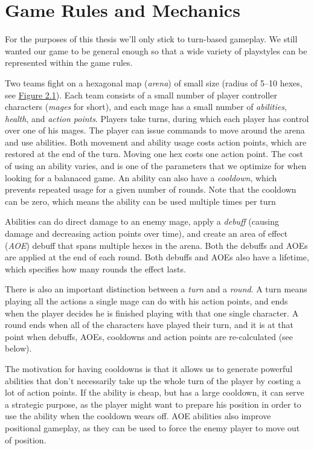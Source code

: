 \chapter{Game Rules and Mechanics}
\label{chapter02}

For the purposes of this thesis we'll only stick to turn-based gameplay. We
still wanted our game to be general enough so that a wide variety of
playstyles can be represented within the game rules.

Two teams fight on a hexagonal map (\emph{arena}) of small size (radius of
5--10 hexes, see \hyperref[fig:arena]{Figure 2.1}). Each team consists of a small number of player controller
characters (\emph{mages} for short), and each mage has a small number of
\emph{abilities}, \emph{health}, and \emph{action points}. Players take turns, during
which each player has control over one of his mages. The player can issue
commands to move around the arena and use abilities. Both movement and ability
usage costs action points, which are restored at the end of the turn.  Moving
one hex costs one action point. The cost of using an ability varies, and is one
of the parameters that we optimize for when looking for a balanaced game. An
ability can also have a \emph{cooldown}, which prevents repeated usage for a
given number of rounds. Note that the cooldown can be zero, which means the
ability can be used multiple times per turn

Abilities can do direct damage to an enemy mage, apply a \emph{debuff} (causing
damage and decreasing action points over time), and create an area of effect
(\emph{AOE}) debuff that spans multiple hexes in the arena. Both the debuffs and
AOEs are applied at the end of each round. Both debuffs and AOEs also have a lifetime,
which specifies how many rounds the effect lasts.

There is also an important distinction between a \emph{turn} and a \emph{round}.
A turn means playing all the actions a single mage can do with his action points,
and ends when the player decides he is finished playing with that one single character.
A round ends when all of the characters have played their turn, and it is at that point
when debuffs, AOEs, cooldowns and action points are re-calculated (see below).

The motivation for having cooldowns is that it allows us to generate powerful
abilities that don't necessarily take up the whole turn of the player by costing
a lot of action points. If the ability is cheap, but has a large cooldown, it can
serve a strategic purpose, as the player might want to prepare his position in order
to use the ability when the cooldown wears off. AOE abilities also improve positional
gameplay, as they can be used to force the enemy player to move out of position.

